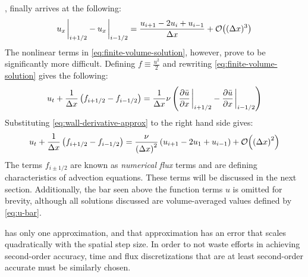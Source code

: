 , finally arrives at the following:
\begin{equation}
	\label{eq:wall-derivative-approx}
	u_x\eval_{i+1/2}-u_x\eval_{i-1/2}=\frac{u_{i+1}-2u_i+u_{i-1}}{\Delta x}+\order{ (\Delta x)^3}
\end{equation}
The nonlinear terms in \cref{eq:finite-volume-solution}, however, prove to be significantly more difficult.
Defining $f\equiv\frac{u^2}{2}$ and rewriting \cref{eq:finite-volume-solution} gives the following:
\begin{equation}
	\label{eq:burgers-equation-with-fluxes}
	u_t + \frac{1}{\Delta x}\left( f_{i+1/2}-f_{i-1/2} \right)=\frac{1}{\Delta x}\nu \left( \pdv{\bar{u}}{x}\eval_{i+1/2}-\pdv{\bar{u}}{x}\eval_{i-1/2} \right)
\end{equation}
Substituting \cref{eq:wall-derivative-approx} to the right hand side gives:
\begin{equation}
	\label{eq:burgers-eq-central-diff}
	u_t + \frac{1}{\Delta x}\left( f_{i+1/2}-f_{i-1/2} \right)=\frac{\nu }{\left( \Delta x \right)^2}\left( u_{i+1}-2u_1+u_{i-1} \right)+\order{\left( \Delta x\right)^2 }
\end{equation}
The terms $f_{i\pm 1/2}$ are known as \textit{numerical flux} terms and are defining characteristics of advection equations.
These terms will be discussed in the next section.
Additionally, the bar seen above the function terms $u$ is omitted for brevity, although all solutions discussed are volume-averaged values defined by \cref{eq:u-bar}.

 has only one approximation, and that approximation has an error that scales quadratically with the spatial step size.
In order to not waste efforts in achieving second-order accuracy, time and flux discretizations that are at least second-order accurate must be similarly chosen.